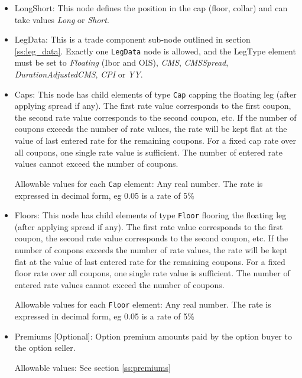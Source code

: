 \begin{itemize}

\item LongShort: This node defines the position in the cap (floor, collar) and can take values \emph{Long} or \emph{Short}.

\item LegData: This is a trade component sub-node outlined in section \ref{ss:leg_data}. Exactly
  one \lstinline!LegData! node is allowed, and the LegType element must
  be set to \emph{Floating} (Ibor and OIS), \emph{CMS}, \emph{CMSSpread}, \emph{DurationAdjustedCMS}, \emph{CPI} or \emph{YY}.

\item Caps: This node has child elements of type \lstinline!Cap!
  capping the floating leg (after applying spread if any). The first rate value corresponds to the
  first coupon, the second rate value corresponds to the second
  coupon, etc. If the number of coupons exceeds the number of rate
  values, the rate will be kept flat at the value of last entered rate
  for the remaining coupons. For a fixed cap rate over all coupons,
  one single rate value is sufficient. The number of entered rate
  values cannot exceed the number of coupons.  

  Allowable values for each \lstinline!Cap! element: Any real number. The rate is expressed in decimal form, eg 0.05 is
  a rate of 5\%

\item Floors: This node has child elements of type
  \lstinline!Floor! flooring the floating leg (after applying spread if any).  The first rate value
  corresponds to the first coupon, the second rate value corresponds
  to the second coupon, etc. If the number of coupons exceeds the
  number of rate values, the rate will be kept flat at the value of
  last entered rate for the remaining coupons. For a fixed floor rate
  over all coupons, one single rate value is sufficient. The number of
  entered rate values cannot exceed the number of coupons.

  Allowable values for each \lstinline!Floor! element: Any real number. The rate is expressed in decimal form, eg 0.05 is
  a rate of 5\%

\item Premiums [Optional]: Option premium amounts paid by the option buyer to the option seller.

Allowable values:  See section \ref{ss:premiums}

\end{itemize}

